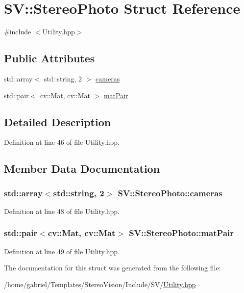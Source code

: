 \hypertarget{struct_s_v_1_1_stereo_photo}{\section{S\-V\-:\-:Stereo\-Photo Struct Reference}
\label{struct_s_v_1_1_stereo_photo}
}


{\ttfamily \#include $<$Utility.\-hpp$>$}

\subsection*{Public Attributes}
\begin{DoxyCompactItemize}
\item 
std\-::array$<$ std\-::string, 2 $>$ \hyperlink{struct_s_v_1_1_stereo_photo_ab9bf6406dbf4a4f03b1591b90841ccf6}{cameras}
\item 
std\-::pair$<$ cv\-::\-Mat, cv\-::\-Mat $>$ \hyperlink{struct_s_v_1_1_stereo_photo_ac54ead2c353e1a20bc15fc06b88f92ee}{mat\-Pair}
\end{DoxyCompactItemize}


\subsection{Detailed Description}


Definition at line 46 of file Utility.\-hpp.



\subsection{Member Data Documentation}
\hypertarget{struct_s_v_1_1_stereo_photo_ab9bf6406dbf4a4f03b1591b90841ccf6}{
\subsubsection[{cameras}]{\setlength{\rightskip}{0pt plus 5cm}std\-::array$<$std\-::string, 2$>$ S\-V\-::\-Stereo\-Photo\-::cameras}}\label{struct_s_v_1_1_stereo_photo_ab9bf6406dbf4a4f03b1591b90841ccf6}


Definition at line 48 of file Utility.\-hpp.

\hypertarget{struct_s_v_1_1_stereo_photo_ac54ead2c353e1a20bc15fc06b88f92ee}{
\subsubsection[{mat\-Pair}]{\setlength{\rightskip}{0pt plus 5cm}std\-::pair$<$cv\-::\-Mat, cv\-::\-Mat$>$ S\-V\-::\-Stereo\-Photo\-::mat\-Pair}}\label{struct_s_v_1_1_stereo_photo_ac54ead2c353e1a20bc15fc06b88f92ee}


Definition at line 49 of file Utility.\-hpp.



The documentation for this struct was generated from the following file\-:\begin{DoxyCompactItemize}
\item 
/home/gabriel/\-Templates/\-Stereo\-Vision/\-Include/\-S\-V/\hyperlink{_utility_8hpp}{Utility.\-hpp}\end{DoxyCompactItemize}

